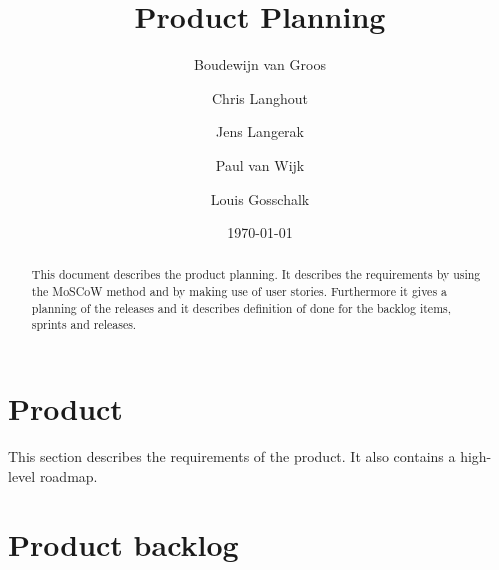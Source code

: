 \documentclass[a4paper]{article}
\title{Product Planning}
\author[1]{Boudewijn van Groos}
\author[2]{Chris Langhout}
\author[3]{Jens Langerak}
\author[4]{Paul van Wijk}
\author[5]{Louis Gosschalk}
\affil[1]{bvangroos \\
	4229843}
\affil[2]{clanghout \\
	4281705}
\affil[3]{jlangerak \\
	4317327}
\affil[4]{pjvanwijk \\
	4285034}
\affil[5]{lgosschalk \\
	4214528}
\affil[ ]{Health Informatics Group C}
\date{\today}
\begin{document}
\maketitle
\begin{abstract}
	This document describes the product planning. It describes the requirements by using the MoSCoW method and by making use of user stories. Furthermore it gives a planning of the releases and it describes definition of done for the backlog items, sprints and releases.
\end{abstract}
\newpage
\tableofcontents
\newpage


\section{Product}
This section describes the requirements of the product. It also contains a high-level roadmap.


\section{Product backlog}






\end{document}
